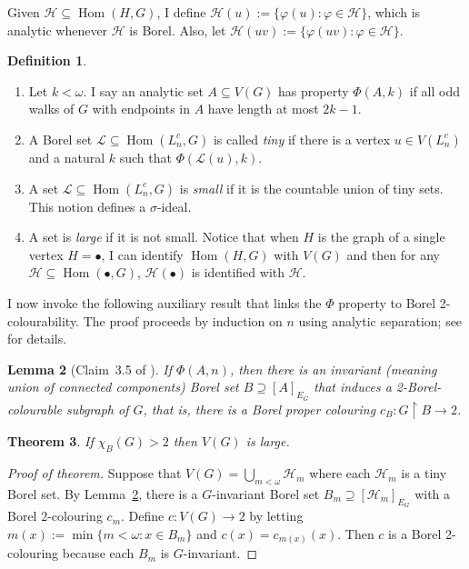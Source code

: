 \documentclass[11pt]{article}
\theoremstyle{plain}
\newtheorem{theorem}{Theorem}[section]
\newtheorem{lemma}[theorem]{Lemma}
\theoremstyle{definition}
\newtheorem{definition}[theorem]{Definition}
\theoremstyle{remark}
\DeclareMathOperator{\Hom}{Hom}
\begin{document}
Given $\mathcal H\subseteq\Hom(H,G)$, I define $\mathcal H(u):=\{\varphi(u):\varphi\in\mathcal H\}$, which is analytic whenever $\mathcal H$ is Borel.
Also, let $\mathcal H(uv):=\{\varphi(uv):\varphi\in\mathcal H\}$.

\begin{definition}\label{def:small}~ 
    \begin{enumerate}
        \item Let $k<\omega$. I say an analytic set $A\subseteq V(G)$ has property $\Phi(A,k)$ if all odd walks of $G$ with endpoints in $A$ have length at most $2k-1$.

        \item A Borel set $\mathcal L\subseteq\Hom(L^c_n,G)$ is called \emph{tiny} if there is a vertex $u\in V(L^c_n)$ and a natural $k$ such that $\Phi(\mathcal L(u),k)$.

        \item A set $\mathcal L\subseteq\Hom(L^c_n,G)$ is \emph{small} if it is the countable union of tiny sets. This notion defines a $\sigma$-ideal.

        \item A set is \emph{large} if it is not small. Notice that when $H$ is the graph of a single vertex $H=\bullet$, I can identify $\Hom(H,G)$ with $V(G)$ and then for any $\mathcal H\subseteq\Hom(\bullet,G)$, $\mathcal H(\bullet)$ is identified with $\mathcal H$.
    \end{enumerate}
\end{definition}

I now invoke the following auxiliary result that links the $\Phi$ property to Borel 2-colourability.
The proof proceeds by induction on $n$ using analytic separation; see \cite[Claims~3.3--3.5]{L0paper} for details.

\begin{lemma}[Claim~3.5 of \cite{L0paper}]\label{lemma:L0-claim3.5}
    If $\Phi(A,n)$, then there is an invariant (meaning union of connected components) Borel set $B\supseteq[A]_{E_G}$ that induces a 2-Borel-colourable subgraph of $G$, that is, there is a Borel proper colouring $c_B\colon G\restriction B\to2$.
\end{lemma}

\begin{theorem}\label{thm:small}
    If $\chi_B(G)>2$ then $V(G)$ is large.
\end{theorem}

\begin{proof}[Proof of theorem]
    Suppose that $V(G)=\bigcup_{m<\omega}\mathcal H_m$ where each $\mathcal H_m$ is a tiny Borel set.
    By Lemma~\ref{lemma:L0-claim3.5}, there is a $G$-invariant Borel set $B_m\supseteq[\mathcal H_m]_{E_G}$ with a Borel 2-colouring $c_m$.
    Define $c\colon V(G)\to2$ by letting $m(x):=\min\{m<\omega:x\in B_m\}$ and $c(x)=c_{m(x)}(x)$.
    Then $c$ is a Borel 2-colouring because each $B_m$ is $G$-invariant.
\end{proof}
\end{document}
